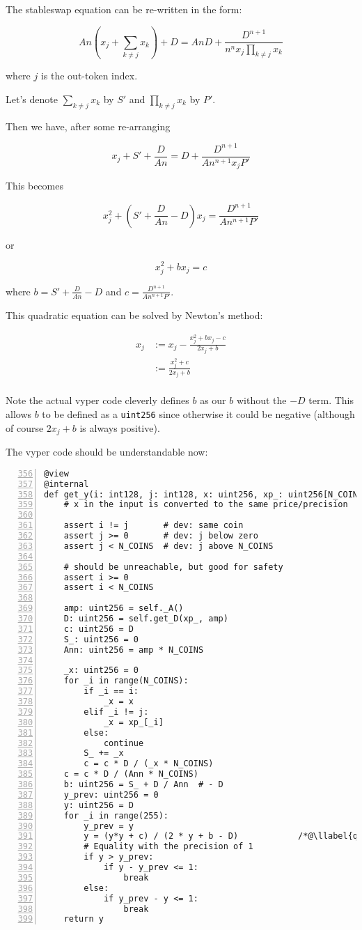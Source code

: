 \documentclass[
]{article}
\makeatletter
\newcommand{\passthrough}[1]{#1}
\newcounter{llabel}[lstlisting]%
\renewcommand*{\thellabel}{%
    \ifnum\value{llabel}<0 %
      \@ctrerr
    \else
      \ifnum\value{llabel}>10 %
        \@ctrerr
      \else
        \protect\ding{\the\numexpr\value{llabel}+201\relax}%
      \fi
    \fi
  }%
\newlength{\llabelsep}
\newcommand*{\llabel}[1]{%
  \begingroup
    \refstepcounter{llabel}%
    \label{#1}%
    \llap{%
      \thellabel\kern\llabelsep
      \hphantom{\lst@numberstyle\the\lst@lineno}%
      \kern\lst@numbersep
    }%
  \endgroup
}
\makeatother
\begin{document}
The stableswap equation can be re-written in the form:

\[ An\left(x_j + \sum_{k\neq j} x_k\right) + D = AnD + \frac{D^{n+1}}{n^n x_j \prod_{k\neq j} x_k} \]

where \(j\) is the out-token index.

Let's denote \(\sum_{k\neq j} x_k\) by \(S'\) and
\(\prod_{k\neq j} x_k\) by \(P'\).

Then we have, after some re-arranging

\[ x_j + S' + \frac{D}{An} = D + \frac{D^{n+1}}{An^{n+1} x_j P'} \]

This becomes

\[ x_j^2 + \left(S' + \frac{D}{An} - D\right) x_j = \frac{D^{n+1}}{An^{n+1}P'}\]

or

\[ x_j^2 + bx_j = c\]

where \(b = S' + \frac{D}{An} - D\) and
\(c = \frac{D^{n+1}}{An^{n+1}P'}\).

This quadratic equation can be solved by Newton's method:

\[ \begin{aligned}
x_j &:= x_j - \frac{x_j^2 + bx_j - c}{2x_j + b}\\
&:= \frac{x_j^2 + c}{2x_j + b} \\
\end{aligned} \]

Note the actual vyper code cleverly defines \(b\) as our \(b\) without
the \(-D\) term. This allows \(b\) to be defined as a
\passthrough{\lstinline!uint256!} since otherwise it could be negative
(although of course \(2x_j + b\) is always positive).

The vyper code should be understandable now:

\begin{lstlisting}[numbers=left, firstnumber=356, label=get_y]
@view
@internal
def get_y(i: int128, j: int128, x: uint256, xp_: uint256[N_COINS]) -> uint256:
    # x in the input is converted to the same price/precision

    assert i != j       # dev: same coin
    assert j >= 0       # dev: j below zero
    assert j < N_COINS  # dev: j above N_COINS

    # should be unreachable, but good for safety
    assert i >= 0
    assert i < N_COINS

    amp: uint256 = self._A()
    D: uint256 = self.get_D(xp_, amp)
    c: uint256 = D
    S_: uint256 = 0
    Ann: uint256 = amp * N_COINS

    _x: uint256 = 0
    for _i in range(N_COINS):
        if _i == i:
            _x = x
        elif _i != j:
            _x = xp_[_i]
        else:
            continue
        S_ += _x
        c = c * D / (_x * N_COINS)
    c = c * D / (Ann * N_COINS)
    b: uint256 = S_ + D / Ann  # - D
    y_prev: uint256 = 0
    y: uint256 = D
    for _i in range(255):
        y_prev = y
        y = (y*y + c) / (2 * y + b - D)            /*@\llabel{quadratic_iteration}@*/
        # Equality with the precision of 1
        if y > y_prev:
            if y - y_prev <= 1:
                break
        else:
            if y_prev - y <= 1:
                break
    return y
\end{lstlisting}
\end{document}

